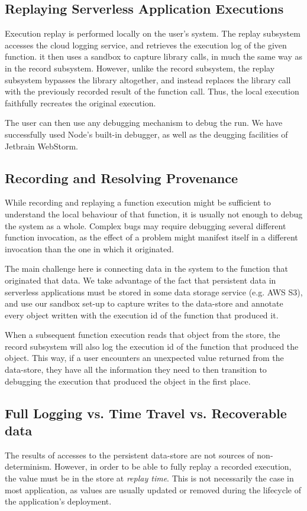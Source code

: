 \subsection{Replaying Serverless Application Executions}
Execution replay is performed locally on the user's system. The replay
subsystem accesses the cloud logging service, and retrieves the execution log
of the given function. it then uses a sandbox to capture library calls, in much
the same way as in the record subsystem. However, unlike the record subsystem,
the replay subsystem bypasses the library altogether, and instead replaces the library call with the previously recorded result of the function call. Thus, the local execution faithfully recreates the original execution.

The user can then use any debugging mechanism to debug the run. We have successfully used Node's built-in debugger, as well as the deugging facilities of Jetbrain WebStorm.

\subsection{Recording and Resolving Provenance}
While recording and replaying a function execution might be sufficient to understand the local behaviour of that function, it is usually not enough to debug the system as a whole. Complex bugs may require debugging several different function invocation, as the effect of a problem might manifest itself in a different invocation than the one in which it originated.

The main challenge here is connecting data in the system to the function that originated that data. We take advantage of the fact that persistent data in serverless applications must be stored in some data storage service (e.g. AWS S3), and use our sandbox set-up to capture writes to the data-store and annotate every object written with the execution id of the function that produced it.

When a subsequent function execution reads that object from the store, the record subsystem will also log the execution id of the function that produced the object. This way, if a user encounters an unexpected value returned from the data-store, they have all the information they need to then transition to debugging the execution that produced the object in the first place.

\subsection{Full Logging vs. Time Travel vs. Recoverable data}
The results of accesses to the persistent data-store are not sources of non-determinism. However, in order to be able to fully replay a recorded execution, the value must be in the store at \emph{replay time}. This is not necessarily the case in most application, as values are usually updated or removed during the lifecycle of the application's deployment.

